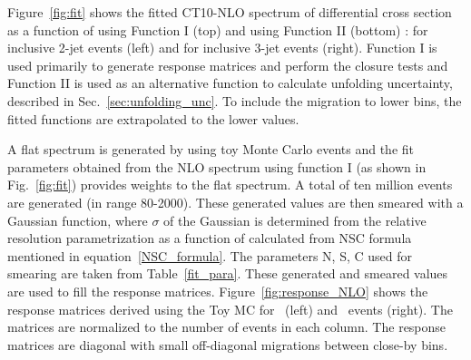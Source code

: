 Figure~\ref{fig:fit} shows the fitted CT10-NLO  spectrum of differential cross section as a function of \httwo using Function I (top) and using Function II (bottom) : for inclusive 2-jet events (left) and for inclusive 3-jet events (right). Function I is used primarily to generate response matrices and perform the closure tests and Function II is used as an alternative function to calculate unfolding uncertainty, described in Sec.~\ref{sec:unfolding_unc}. To include the migration to lower bins, the fitted functions are extrapolated to the lower \httwo values.

A flat \httwo spectrum is generated by using toy Monte Carlo events and the fit parameters obtained from the NLO spectrum using function I (as shown in Fig.~\ref{fig:fit}) provides weights to the flat spectrum. A total of ten million events are generated (in \httwo range 80-2000). These generated values are then smeared with a Gaussian function, where $\sigma$ of the Gaussian is determined from the relative resolution parametrization as a function of \httwo calculated from NSC formula mentioned in equation~\ref{NSC_formula}. The parameters N, S, C used for smearing are taken from Table~\ref{fit_para}. These generated and smeared values are used to fill the response matrices. Figure~\ref{fig:response_NLO} shows the response matrices derived using the Toy MC for \njt~(left) and \njth~events (right). The matrices are normalized to the number of events in each column. The response matrices are diagonal with small off-diagonal migrations between close-by \httwo bins.

